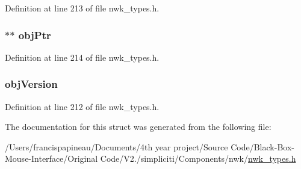 \-Definition at line 213 of file nwk\-\_\-types.\-h.

\hypertarget{structioctlNVObj__t_a949432122afe3e9a023a8ffb333e81d4}{
\subsubsection[{obj\-Ptr}]{$\ast$$\ast$ {\bf obj\-Ptr}}}\label{structioctlNVObj__t_a949432122afe3e9a023a8ffb333e81d4}


\-Definition at line 214 of file nwk\-\_\-types.\-h.

\hypertarget{structioctlNVObj__t_a822a4cb6fbb3487cd295d0620a299c02}{
\subsubsection[{obj\-Version}]{ {\bf obj\-Version}}}\label{structioctlNVObj__t_a822a4cb6fbb3487cd295d0620a299c02}


\-Definition at line 212 of file nwk\-\_\-types.\-h.



\-The documentation for this struct was generated from the following file\-:\begin{DoxyCompactItemize}
\item 
/\-Users/francispapineau/\-Documents/4th year project/\-Source Code/\-Black-\/\-Box-\/\-Mouse-\/\-Interface/\-Original Code/\-V2./simpliciti/\-Components/nwk/\hyperlink{nwk__types_8h}{nwk\-\_\-types.\-h}\end{DoxyCompactItemize}
